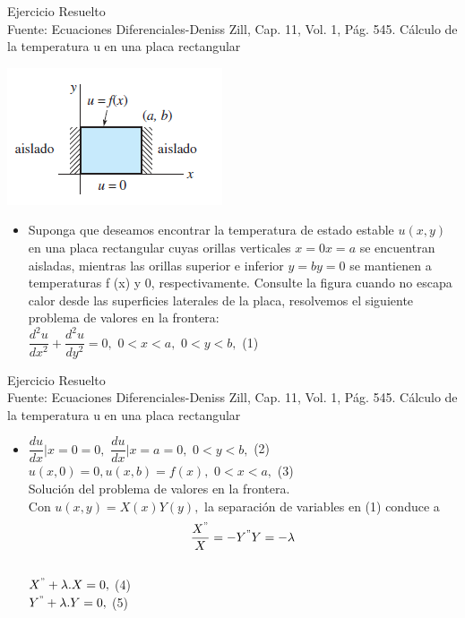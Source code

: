 \documentclass[10pt,a4paper]{beamer}
\author{Clinton Semanate}
\begin{document}
\begin{frame}{Ejercicio Resuelto\\
}{Fuente: Ecuaciones Diferenciales-Deniss Zill, Cap. 11, Vol. 1, Pág. 545.
Cálculo de la temperatura u en una placa rectangular}

\begin{center}
\includegraphics[scale=0.7]{placa.png} 
\end{center}

  \begin{itemize}
  \item
    Suponga que deseamos encontrar la temperatura de estado estable
$u(x, y)$ en una placa rectangular cuyas orillas verticales $x=0 x=a$ se encuentran aisladas,
mientras las orillas superior e inferior $y=b y=0$ se mantienen a temperaturas f (x)
y 0, respectivamente. Consulte la figura cuando no escapa calor desde las superficies
laterales de la placa, resolvemos el siguiente problema de valores en la frontera:\\
$\dfrac{d^{2}u}{dx^{2}}+\dfrac{d^{2}u}{dy^{2}}=0, $
$ 0<x<a,$
$0<y<b,$ (1)\\

  \end{itemize}
\end{frame}

\begin{frame}{Ejercicio Resuelto\\
}{Fuente: Ecuaciones Diferenciales-Deniss Zill, Cap. 11, Vol. 1, Pág. 545.
Cálculo de la temperatura u en una placa rectangular}


  \begin{itemize}
  \item
    $\dfrac{du}{dx}|x=0 =0, $ 
$ \dfrac{du}{dx}|x=a =0, $ $ 0<y<b,$ (2)\\
$u(x,0)=0 ,  u(x,b)=f(x), $ $0<x<a,$ (3)\\
Solución del problema de valores en la frontera.\\
Con $u(x,y)=X(x)Y(y),$ la separación de variables en (1) conduce a\\
$$\dfrac{X^{"}}{X}=-Y^{"}{Y}=-\lambda$$\\
$X^{"}+\lambda.X=0,$ (4) \\
$Y^{"}+\lambda.Y=0,$ (5)\\
    
  \end{itemize}
\end{frame}
\end{document}
